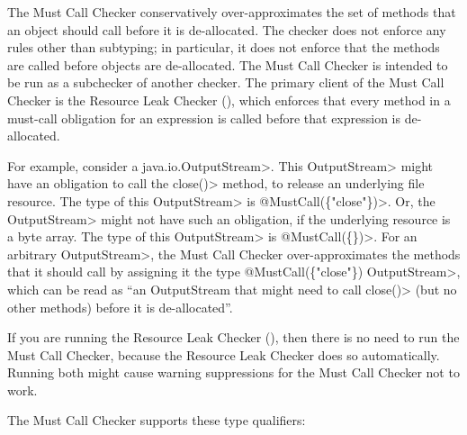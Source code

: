 
The Must Call Checker conservatively over-approximates
the set of methods that an object should call before it is de-allocated.
The checker does not enforce any rules other than subtyping;
in particular, it does not enforce that the methods are called before
objects are de-allocated.
The Must Call Checker is intended to be run as a subchecker of another checker.
The primary client
of the Must Call Checker is the Resource Leak Checker (),
which enforces that every method in a must-call obligation for an expression is called
before that expression is de-allocated.

For example, consider a \<java.io.OutputStream>.  This \<OutputStream>
might have an obligation to call the \<close()> method, to release an
underlying file resource. The type of this \<OutputStream> is
\<@MustCall(\{"close"\})>.  Or, the \<OutputStream> might not have such an
obligation, if the underlying resource is a byte array. The type of this
\<OutputStream> is \<@MustCall(\{\})>.
For an arbitrary \<OutputStream>, the Must Call
Checker over-approximates the methods that it should call by assigning it
the type \<@MustCall(\{"close"\}) OutputStream>, which can be read as ``an
OutputStream that might need to call \<close()> (but no other methods)
before it is de-allocated''.

If you are running the Resource Leak Checker
(), then there is no need to run the
Must Call Checker, because the Resource Leak Checker does so automatically.
Running both might cause warning suppressions for the Must Call Checker not to
work.



The Must Call Checker supports these type qualifiers:

